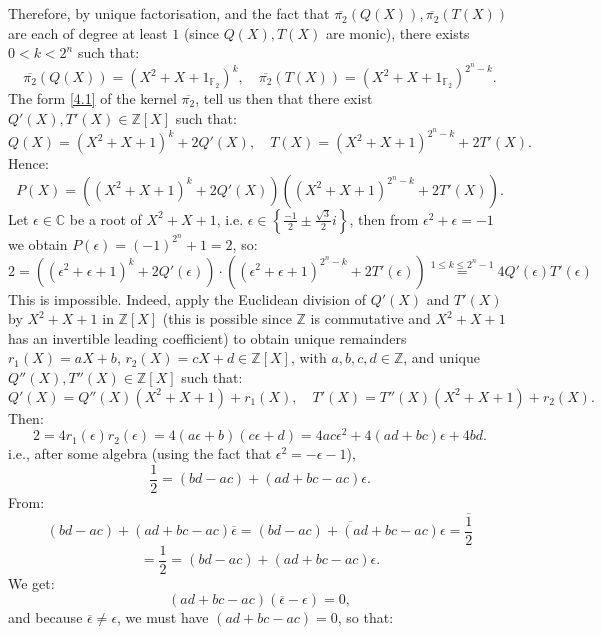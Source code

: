 \documentclass[11pt, a4paper, oneside]{article}
\theoremstyle{remark}
\theoremstyle{lemma}
\begin{document}
\\\\
Therefore, by unique factorisation, and the fact that \(\overline{\pi_2}\left( Q(X) \right), \overline{\pi_2}\left( T(X) \right)\) are each of degree at least \(1\) (since \(Q(X), T(X)\) are monic), there exists \(0< k < 2^n\) such that:
\[
\overline{\pi_2}(Q(X)) = \left( X^2 + X + 1_{\mathbb{F}_2} \right)^k, \quad \overline{\pi_2}(T(X)) = \left( X^2 + X + 1_{\mathbb{F}_2} \right)^{2^n - k}.
\]
The form \eqref{4.1} of the kernel \( \overline{\pi_2} \), tell us then that there exist \( Q'(X), T'(X) \in \mathbb{Z}[X] \) such that:
\[
Q(X) = \left( X^2 + X + 1 \right)^k + 2Q'(X), \quad T(X) = \left( X^2 + X + 1 \right)^{2^n - k} + 2T'(X).
\]
Hence:
\[
P(X) = \left( \left( X^2 + X + 1 \right)^k + 2Q'(X) \right) \left( \left( X^2 + X + 1 \right)^{2^n - k} + 2T'(X) \right).
\]
Let \( \epsilon \in \mathbb{C} \) be a root of \( X^2 + X + 1 \), i.e. \( \epsilon \in \left\{ \frac{-1}{2} \pm \frac{\sqrt{3}}{2}i \right\} \), then from \(\epsilon^2+\epsilon=-1\) we obtain \( P(\epsilon) = (-1)^{2^n} + 1 = 2 \), so:
\[
2 = \left(\left( \epsilon^2 + \epsilon + 1 \right)^k + 2Q'(\epsilon)\right) \cdot \left(\left( \epsilon^2 + \epsilon + 1 \right)^{2^n - k} + 2T'(\epsilon)\right) \overset{1\leq k\leq 2^n-1}{=} 4 Q'(\epsilon) T'(\epsilon)
\]
This is impossible. Indeed, apply the Euclidean division of \( Q'(X) \) and \( T'(X) \) by \( X^2 + X + 1 \) in \( \mathbb{Z}[X] \) (this is possible since \( \mathbb{Z} \) is commutative and \( X^2 + X + 1 \) has an invertible leading coefficient) to obtain unique remainders \( r_1(X) = aX + b \), \( r_2(X) = cX + d \in \mathbb{Z}[X] \), with \( a, b, c, d \in \mathbb{Z} \), and unique \( Q''(X), T''(X) \in \mathbb{Z}[X] \) such that:
\[
Q'(X) = Q''(X)\left( X^2 + X + 1 \right) + r_1(X), \quad T'(X) = T''(X)\left( X^2 + X + 1 \right) + r_2(X).
\]
Then:
\[
2 = 4 r_1(\epsilon) r_2(\epsilon) = 4(a\epsilon + b)(c\epsilon + d) = 4ac\epsilon^2 + 4(ad + bc)\epsilon + 4bd.
\]
i.e., after some algebra (using the fact that \(\epsilon^2 = -\epsilon - 1\)),
\[
\frac{1}{2} = \left( bd - ac \right) + \left( ad + bc- ac \right) \epsilon.
\]
From:  
\[
\left( bd - ac \right) + \left( ad + bc - ac \right) \overline{\epsilon}  
= \overline{\left( bd - ac \right) + \left( ad + bc - ac \right) \epsilon}  
= \overline{\frac{1}{2}}
\]
\[
= \frac{1}{2}  
= \left( bd - ac \right) + \left( ad + bc - ac \right) \epsilon.
\]
We get:  
\[
\left( ad + bc - ac \right) \left( \overline{\epsilon} - \epsilon \right) = 0,
\]
and because \(\overline{\epsilon} \neq \epsilon\), we must have \(\left( ad + bc - ac \right) = 0\), so that:  
\end{document}
